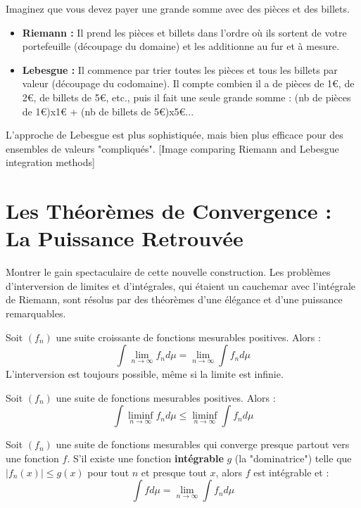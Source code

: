 \begin{remark}
    Imaginez que vous devez payer une grande somme avec des pièces et des billets.
    \begin{itemize}
        \item \textbf{Riemann :} Il prend les pièces et billets dans l'ordre où ils sortent de votre portefeuille (découpage du domaine) et les additionne au fur et à mesure.
        \item \textbf{Lebesgue :} Il commence par trier toutes les pièces et tous les billets par valeur (découpage du codomaine). Il compte combien il a de pièces de 1€, de 2€, de billets de 5€, etc., puis il fait une seule grande somme : (nb de pièces de 1€)x1€ + (nb de billets de 5€)x5€...
    \end{itemize}
    L'approche de Lebesgue est plus sophistiquée, mais bien plus efficace pour des ensembles de valeurs "compliqués". [Image comparing Riemann and Lebesgue integration methods]
\end{remark}

\section{Les Théorèmes de Convergence : La Puissance Retrouvée}

\begin{objectif}
    Montrer le gain spectaculaire de cette nouvelle construction. Les problèmes d'interversion de limites et d'intégrales, qui étaient un cauchemar avec l'intégrale de Riemann, sont résolus par des théorèmes d'une élégance et d'une puissance remarquables.
\end{objectif}

\begin{theorem}
    Soit $(f_n)$ une suite croissante de fonctions mesurables positives. Alors :
    $$ \int \lim_{n\to\infty} f_n d\mu = \lim_{n\to\infty} \int f_n d\mu $$
    L'interversion est toujours possible, même si la limite est infinie.
\end{theorem}

\begin{lemma}
    Soit $(f_n)$ une suite de fonctions mesurables positives. Alors :
    $$ \int \liminf_{n\to\infty} f_n d\mu \le \liminf_{n\to\infty} \int f_n d\mu $$
\end{lemma}

\begin{theorem}
    Soit $(f_n)$ une suite de fonctions mesurables qui converge presque partout vers une fonction $f$. S'il existe une fonction \textbf{intégrable} $g$ (la "dominatrice") telle que $|f_n(x)| \le g(x)$ pour tout $n$ et presque tout $x$, alors $f$ est intégrable et :
    $$ \int f d\mu = \lim_{n\to\infty} \int f_n d\mu $$
\end{theorem}

